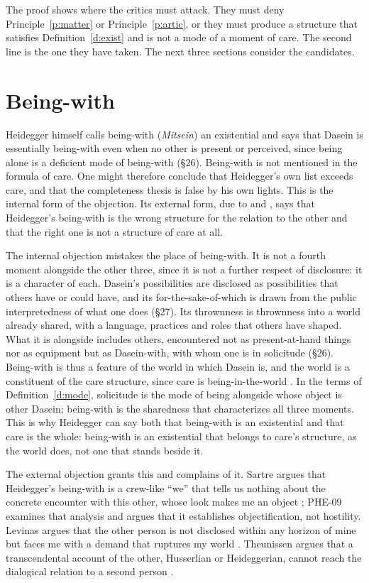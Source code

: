 \documentclass{situationist-preprint}
\begin{document}
The proof shows where the critics must attack. They must deny Principle~\ref{p:matter} or Principle~\ref{p:artic}, or they must produce a structure that satisfies Definition~\ref{d:exist} and is not a mode of a moment of care. The second line is the one they have taken. The next three sections consider the candidates.

\section{Being-with}\label{s:with}

Heidegger himself calls being-with (\emph{Mitsein}) an existential and says that Dasein is essentially being-with even when no other is present or perceived, since being alone is a deficient mode of being-with (\S26). Being-with is not mentioned in the formula of care. One might therefore conclude that Heidegger's own list exceeds care, and that the completeness thesis is false by his own lights. This is the internal form of the objection. Its external form, due to \citet{Sartre1943} and \citet{Levinas1961}, says that Heidegger's being-with is the wrong structure for the relation to the other and that the right one is not a structure of care at all.

The internal objection mistakes the place of being-with. It is not a fourth moment alongside the other three, since it is not a further respect of disclosure: it is a character of each. Dasein's possibilities are disclosed as possibilities that others have or could have, and its for-the-sake-of-which is drawn from the public interpretedness of what one does (\S27). Its thrownness is thrownness into a world already shared, with a language, practices and roles that others have shaped. What it is alongside includes others, encountered not as present-at-hand things nor as equipment but as Dasein-with, with whom one is in solicitude (\S26). Being-with is thus a feature of the world in which Dasein is, and the world is a constituent of the care structure, since care is being-in-the-world \citep[\S41]{Heidegger1927}. In the terms of Definition~\ref{d:mode}, solicitude is the mode of being alongside whose object is other Dasein; being-with is the sharedness that characterizes all three moments. This is why Heidegger can say both that being-with is an existential and that care is the whole: being-with is an existential that belongs to care's structure, as the world does, not one that stands beside it.

The external objection grants this and complains of it. Sartre argues that Heidegger's being-with is a crew-like \enquote{we} that tells us nothing about the concrete encounter with this other, whose look makes me an object \citep[Part~III, ch.~1]{Sartre1943}; PHE-09 examines that analysis and argues that it establishes objectification, not hostility. Levinas argues that the other person is not disclosed within any horizon of mine but faces me with a demand that ruptures my world \citep{Levinas1961}. Theunissen argues that a transcendental account of the other, Husserlian or Heideggerian, cannot reach the dialogical relation to a second person \citep{Theunissen1965}.
\end{document}
